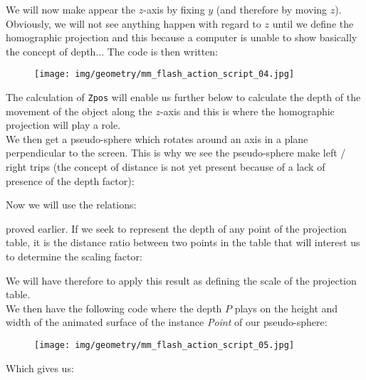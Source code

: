 	\begin{tcolorbox}[colframe=black,colback=white,sharp corners]
	\begin{center}
	\centering
	\end{center}
	We will now make appear the $z$-axis by fixing $y$ (and therefore by moving $z$). Obviously, we will not see anything happen with regard to $z$ until we define the homographic projection and this because a computer is unable to show basically the concept of depth... The code is then written:
	\begin{figure}[H]
		\centering
		\texttt{[image: img/geometry/mm\_flash\_action\_script\_04.jpg]}
	\end{figure}
	\end{tcolorbox}
	
	\begin{tcolorbox}[colframe=black,colback=white,sharp corners]
	The calculation of \texttt{Zpos} will enable us further below to calculate the depth of the movement of the object along the $z$-axis and this is where the homographic projection will play a role.\\
	
	We then get a pseudo-sphere which rotates around an axis in a plane perpendicular to the screen. This is why we see the pseudo-sphere make left / right trips (the concept of distance is not yet present because of a lack of presence of the depth factor):
	\begin{center}
	\centering
	\end{center}
	Now we will use the relations:
	
	proved earlier. If we seek to represent the depth of any point of the projection table, it is the distance ratio between two points in the table that will interest us to determine the scaling factor:
	
	\end{tcolorbox}
	
	\begin{tcolorbox}[colframe=black,colback=white,sharp corners]
	We will have therefore to apply this result as defining the scale of the projection table.\\

	We then have the following code where the depth $P$ plays on the height and width of the animated surface of the instance \textit{Point} of our pseudo-sphere:
	\begin{figure}[H]
		\centering
		\texttt{[image: img/geometry/mm\_flash\_action\_script\_05.jpg]}
	\end{figure}
	Which gives us:
	\begin{center}
	\centering
	\end{center}
	\end{tcolorbox}
	
